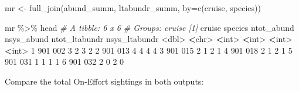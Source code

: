 \documentclass[
]{book}
\newenvironment{Shaded}{\begin{snugshade}}{\end{snugshade}}
\newcommand{\AttributeTok}[1]{\textcolor[rgb]{0.77,0.63,0.00}{#1}}
\newcommand{\CommentTok}[1]{\textcolor[rgb]{0.56,0.35,0.01}{\textit{#1}}}
\newcommand{\ConstantTok}[1]{\textcolor[rgb]{0.00,0.00,0.00}{#1}}
\newcommand{\DecValTok}[1]{\textcolor[rgb]{0.00,0.00,0.81}{#1}}
\newcommand{\ErrorTok}[1]{\textcolor[rgb]{0.64,0.00,0.00}{\textbf{#1}}}
\newcommand{\FunctionTok}[1]{\textcolor[rgb]{0.00,0.00,0.00}{#1}}
\newcommand{\NormalTok}[1]{#1}
\newcommand{\OtherTok}[1]{\textcolor[rgb]{0.56,0.35,0.01}{#1}}
\newcommand{\SpecialCharTok}[1]{\textcolor[rgb]{0.00,0.00,0.00}{#1}}
\newcommand{\StringTok}[1]{\textcolor[rgb]{0.31,0.60,0.02}{#1}}
\begin{document}
\begin{Shaded}
\begin{Highlighting}[]
\NormalTok{mr }\OtherTok{\textless{}{-}} \FunctionTok{full\_join}\NormalTok{(abund\_summ, ltabundr\_summ, }\AttributeTok{by=}\FunctionTok{c}\NormalTok{(}\StringTok{\textquotesingle{}cruise\textquotesingle{}}\NormalTok{, }\StringTok{\textquotesingle{}species\textquotesingle{}}\NormalTok{))}

\NormalTok{mr }\SpecialCharTok{\%\textgreater{}\%}\NormalTok{ head}
\CommentTok{\# A tibble: 6 x 6}
\CommentTok{\# Groups:   cruise [1]}
\NormalTok{  cruise species ntot\_abund nsys\_abund ntot\_ltabundr nsys\_ltabundr}
   \SpecialCharTok{\textless{}}\NormalTok{dbl}\SpecialCharTok{\textgreater{}} \ErrorTok{\textless{}}\NormalTok{chr}\SpecialCharTok{\textgreater{}}        \ErrorTok{\textless{}}\NormalTok{int}\SpecialCharTok{\textgreater{}}      \ErrorTok{\textless{}}\NormalTok{int}\SpecialCharTok{\textgreater{}}         \ErrorTok{\textless{}}\NormalTok{int}\SpecialCharTok{\textgreater{}}         \ErrorTok{\textless{}}\NormalTok{int}\SpecialCharTok{\textgreater{}}
\DecValTok{1}    \DecValTok{901} \DecValTok{002}              \DecValTok{3}          \DecValTok{2}             \DecValTok{3}             \DecValTok{2}
\DecValTok{2}    \DecValTok{901} \DecValTok{013}              \DecValTok{4}          \DecValTok{4}             \DecValTok{4}             \DecValTok{4}
\DecValTok{3}    \DecValTok{901} \DecValTok{015}              \DecValTok{2}          \DecValTok{1}             \DecValTok{2}             \DecValTok{1}
\DecValTok{4}    \DecValTok{901} \DecValTok{018}              \DecValTok{2}          \DecValTok{1}             \DecValTok{2}             \DecValTok{1}
\DecValTok{5}    \DecValTok{901} \DecValTok{031}              \DecValTok{1}          \DecValTok{1}             \DecValTok{1}             \DecValTok{1}
\DecValTok{6}    \DecValTok{901} \DecValTok{032}              \DecValTok{2}          \DecValTok{0}             \DecValTok{2}             \DecValTok{0}
\end{Highlighting}
\end{Shaded}

Compare the total On-Effort sightings in both outputs:

\begin{Shaded}
\end{Shaded}
\end{document}
